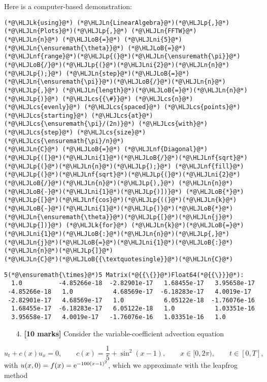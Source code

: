 \documentclass[12pt,a4paper]{article}
\newcommand{\HLJLk}[1]{\textcolor[RGB]{148,91,176}{\textbf{#1}}}
\newcommand{\HLJLn}[1]{#1}
\newcommand{\HLJLnf}[1]{\textcolor[RGB]{66,102,213}{#1}}
\newcommand{\HLJLni}[1]{\textcolor[RGB]{59,151,46}{#1}}
\newcommand{\HLJLoB}[1]{\textcolor[RGB]{102,102,102}{\textbf{#1}}}
\newcommand{\HLJLp}[1]{#1}
\newcommand{\HLJLcs}[1]{\textcolor[RGB]{153,153,119}{\textit{#1}}}
\begin{document}
Here is a computer-based demonstration:


\begin{lstlisting}
(*@\HLJLk{using}@*) (*@\HLJLn{LinearAlgebra}@*)(*@\HLJLp{,}@*) (*@\HLJLn{Plots}@*)(*@\HLJLp{,}@*) (*@\HLJLn{FFTW}@*)
(*@\HLJLn{n}@*) (*@\HLJLoB{=}@*) (*@\HLJLni{5}@*)
(*@\HLJLn{\ensuremath{\theta}}@*) (*@\HLJLoB{=}@*) (*@\HLJLnf{range}@*)(*@\HLJLp{(}@*)(*@\HLJLn{\ensuremath{\pi}}@*)(*@\HLJLoB{/}@*)(*@\HLJLp{(}@*)(*@\HLJLni{2}@*)(*@\HLJLn{n}@*)(*@\HLJLp{);}@*) (*@\HLJLn{step}@*)(*@\HLJLoB{=}@*)(*@\HLJLn{\ensuremath{\pi}}@*)(*@\HLJLoB{/}@*)(*@\HLJLn{n}@*)(*@\HLJLp{,}@*) (*@\HLJLn{length}@*)(*@\HLJLoB{=}@*)(*@\HLJLn{n}@*)(*@\HLJLp{)}@*) (*@\HLJLcs{{\#}}@*) (*@\HLJLcs{n}@*) (*@\HLJLcs{evenly}@*) (*@\HLJLcs{spaced}@*) (*@\HLJLcs{points}@*) (*@\HLJLcs{starting}@*) (*@\HLJLcs{at}@*) (*@\HLJLcs{\ensuremath{\pi}/(2n)}@*) (*@\HLJLcs{with}@*) (*@\HLJLcs{step}@*) (*@\HLJLcs{size}@*) (*@\HLJLcs{\ensuremath{\pi}/n}@*)
(*@\HLJLn{C}@*) (*@\HLJLoB{=}@*) (*@\HLJLnf{Diagonal}@*)(*@\HLJLp{([}@*)(*@\HLJLni{1}@*)(*@\HLJLoB{/}@*)(*@\HLJLnf{sqrt}@*)(*@\HLJLp{(}@*)(*@\HLJLn{n}@*)(*@\HLJLp{);}@*) (*@\HLJLnf{fill}@*)(*@\HLJLp{(}@*)(*@\HLJLnf{sqrt}@*)(*@\HLJLp{(}@*)(*@\HLJLni{2}@*)(*@\HLJLoB{/}@*)(*@\HLJLn{n}@*)(*@\HLJLp{),}@*) (*@\HLJLn{n}@*)(*@\HLJLoB{-}@*)(*@\HLJLni{1}@*)(*@\HLJLp{)])}@*) (*@\HLJLoB{*}@*) (*@\HLJLp{[}@*)(*@\HLJLnf{cos}@*)(*@\HLJLp{((}@*)(*@\HLJLn{k}@*)(*@\HLJLoB{-}@*)(*@\HLJLni{1}@*)(*@\HLJLp{)}@*)(*@\HLJLoB{*}@*)(*@\HLJLn{\ensuremath{\theta}}@*)(*@\HLJLp{[}@*)(*@\HLJLn{j}@*)(*@\HLJLp{])}@*) (*@\HLJLk{for}@*) (*@\HLJLn{k}@*)(*@\HLJLoB{=}@*)(*@\HLJLni{1}@*)(*@\HLJLoB{:}@*)(*@\HLJLn{n}@*)(*@\HLJLp{,}@*) (*@\HLJLn{j}@*)(*@\HLJLoB{=}@*)(*@\HLJLni{1}@*)(*@\HLJLoB{:}@*)(*@\HLJLn{n}@*)(*@\HLJLp{]}@*)
(*@\HLJLn{C}@*)(*@\HLJLoB{{\textquotesingle}}@*)(*@\HLJLn{C}@*)
\end{lstlisting}

\begin{lstlisting}
5(*@\ensuremath{\times}@*)5 Matrix(*@{{\{}}@*)Float64(*@{{\}}}@*):
  1.0          -4.85266e-18  -2.82901e-17   1.68455e-17   3.95658e-17
 -4.85266e-18   1.0           4.68569e-17  -6.18283e-17   4.0019e-17
 -2.82901e-17   4.68569e-17   1.0           6.05122e-18  -1.76076e-16
  1.68455e-17  -6.18283e-17   6.05122e-18   1.0           1.03351e-16
  3.95658e-17   4.0019e-17   -1.76076e-16   1.03351e-16   1.0
\end{lstlisting}


\begin{itemize}
\item[4. ] \textbf{[10 marks]}  Consider the variable-coefficient advection equation

\end{itemize}
\[
   u_t + c(x)u_x = 0, \qquad c(x) = \frac{1}{5} + \sin^2(x-1), \qquad x \in [0, 2\pi), \qquad t \in [0, T],
\]
with $u(x,0) = f(x) = {\rm e}^{-100(x-1)^2}$, which we approximate with the leapfrog method
\end{document}
